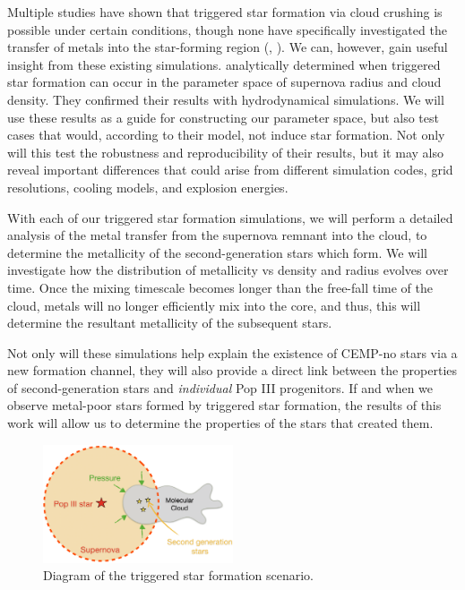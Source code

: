 \documentclass[a4paper, 12pt]{article}
\begin{document}
Multiple studies have shown that triggered star formation via cloud crushing is possible under certain conditions, though none have specifically investigated the transfer of metals into the star-forming region (\cite{Melioli2006}, \cite{Leao2009}). We can, however, gain useful insight from these existing simulations. \cite{Melioli2006} analytically determined when triggered star formation can occur in the parameter space of supernova radius and cloud density. They confirmed their results with hydrodynamical simulations. We will use these results as a guide for constructing our parameter space, but also test cases that would, according to their model, not induce star formation. Not only will this test the robustness and reproducibility of their results, but it may also reveal important differences that could arise from different simulation codes, grid resolutions, cooling models, and explosion energies.

With each of our triggered star formation simulations, we will perform a detailed analysis of the metal transfer from the supernova remnant into the cloud, to determine the metallicity of the second-generation stars which form. We will investigate how the distribution of metallicity vs density and radius evolves over time. Once the mixing timescale becomes longer than the free-fall time of the cloud, metals will no longer efficiently mix into the core, and thus, this will determine the resultant metallicity of the subsequent stars. 

Not only will these simulations help explain the existence of CEMP-no stars via a new formation channel, they will also provide a direct link between the properties of second-generation stars and \textit{individual} Pop III progenitors. If and when we observe metal-poor stars formed by triggered star formation, the results of this work will allow us to determine the properties of the stars that created them.


\begin{figure}
  \includegraphics[width=0.5\textwidth]{figures/tsf2}
  \caption{Diagram of the triggered star formation scenario.}
  \label{fig:tsf}
\end{figure}
\end{document}
